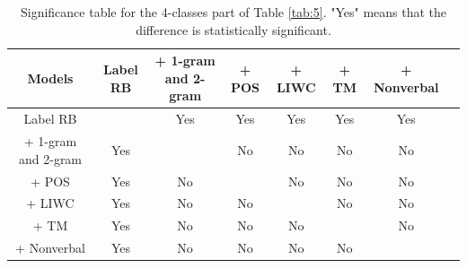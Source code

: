 \documentclass[11pt]{article}
\begin{document}
\begin{table}[t]
  \tabcolsep=0.2cm
  \small
  \centering
  \begin{tabular}{c|ccccccc} \toprule 
    Models & Label RB & + 1-gram and 2-gram & + POS & + LIWC & + TM  & + Nonverbal \\ \midrule 
    Label RB & & Yes & Yes & Yes & Yes & Yes\\ 
    + 1-gram and 2-gram & Yes & & No & No & No & No \\ 
    + POS & Yes & No & & No & No & No\\
    + LIWC & Yes & No & No & & No & No \\
    + TM & Yes & No & No & No & & No \\
    + Nonverbal & Yes & No & No & No & No & \\ \bottomrule
  \end{tabular}
  \caption{Significance table for the 4-classes part of Table \ref{tab:5}. "Yes" means that the difference is statistically significant.}
  \label{tab:11}
\end{table}
\end{document}

